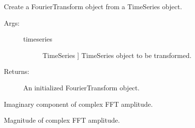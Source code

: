 \documentclass[letterpaper,10pt,english]{sphinxmanual}
\begin{document}
\begin{fulllineitems}
\begin{fulllineitems}
\begin{description}
\begin{description}
\begin{description}
\end{description}

\end{description}

\end{description}

\end{fulllineitems}


\begin{fulllineitems}
\label{\detokenize{index:sigpropy.FourierTransform.from_timeseries}}
Create a FourierTransform object from a TimeSeries object.
\begin{description}
\item[{Args:}] \leavevmode\begin{description}
\item[{timeseries}] \leavevmode{[}TimeSeries {]}
TimeSeries object to be transformed.

\end{description}

\item[{Returns:}] \leavevmode
An initialized FourierTransform object.

\end{description}

\end{fulllineitems}


\begin{fulllineitems}
\label{\detokenize{index:sigpropy.FourierTransform.imag}}
Imaginary component of complex FFT amplitude.

\end{fulllineitems}


\begin{fulllineitems}
\label{\detokenize{index:sigpropy.FourierTransform.mag}}
Magnitude of complex FFT amplitude.


\end{fulllineitems}
\end{fulllineitems}
\end{document}
